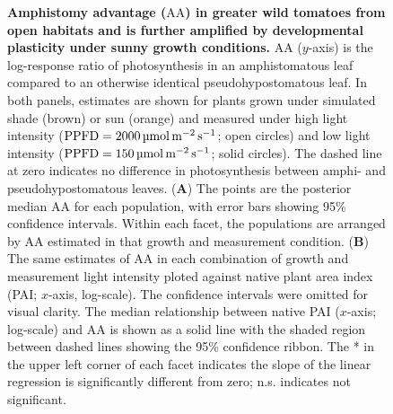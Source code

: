 \documentclass[
  letterpaper,
  DIV=11,
  numbers=noendperiod]{scrartcl}
\newcommand{\aax}{$\mathrm{AA}$}
\newcommand{\ppfdequals}[1]{$\mathrm{PPFD} = \qty{#1}{\micro\mol\raiseto{-2}\meter\raiseto{-1}\second}$}
\begin{document}
\begin{figure}


\caption{\label{fig-aacap}\textbf{Amphistomy advantage (\aax{}) in greater wild tomatoes from open habitats and is further amplified by developmental plasticity under sunny growth conditions.}
\aax{} (\(y\)-axis) is the log-response ratio of photosynthesis in an
amphistomatous leaf compared to an otherwise identical
pseudohypostomatous leaf. In both panels, estimates are shown for plants
grown under simulated shade (brown) or sun (orange) and measured under
high light intensity (\ppfdequals{2000}; open circles) and low light
intensity (\ppfdequals{150}; solid circles). The dashed line at zero
indicates no difference in photosynthesis between amphi- and
pseudohypostomatous leaves. (\textbf{A}) The points are the posterior
median \aax{} for each population, with error bars showing 95\%
confidence intervals. Within each facet, the populations are arranged by
\aax{} estimated in that growth and measurement condition. (\textbf{B})
The same estimates of \aax{} in each combination of growth and
measurement light intensity ploted against native plant area index (PAI;
\(x\)-axis, log-scale). The confidence intervals were omitted for visual
clarity. The median relationship between native PAI (\(x\)-axis;
log-scale) and \aax{} is shown as a solid line with the shaded region
between dashed lines showing the 95\% confidence ribbon. The * in the
upper left corner of each facet indicates the slope of the linear
regression is significantly different from zero; n.s. indicates not
significant.}

\end{figure}%
\end{document}
